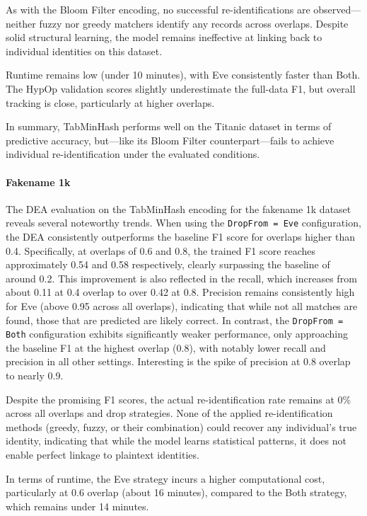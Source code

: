 As with the Bloom Filter encoding, no successful re-identifications are observed—neither fuzzy nor greedy matchers identify any records across overlaps.
Despite solid structural learning, the model remains ineffective at linking back to individual identities on this dataset.

Runtime remains low (under 10 minutes), with Eve consistently faster than Both. The HypOp validation scores slightly underestimate the full-data F1, but overall tracking is close, particularly at higher overlaps.

In summary, TabMinHash performs well on the Titanic dataset in terms of predictive accuracy, but—like its Bloom Filter counterpart—fails to achieve individual re-identification under the evaluated conditions.


\paragraph{Fakename 1k}
The DEA evaluation on the TabMinHash encoding for the fakename 1k dataset reveals several noteworthy trends.
When using the \texttt{DropFrom = Eve} configuration, the DEA consistently outperforms the baseline F1 score for overlaps higher than 0.4.
Specifically, at overlaps of 0.6 and 0.8, the trained F1 score reaches approximately 0.54 and 0.58 respectively, clearly surpassing the baseline of around 0.2.
This improvement is also reflected in the recall, which increases from about 0.11 at 0.4 overlap to over 0.42 at 0.8.
Precision remains consistently high for Eve (above 0.95 across all overlaps), indicating that while not all matches are found, those that are predicted are likely correct.
In contrast, the \texttt{DropFrom = Both} configuration exhibits significantly weaker performance, only approaching the baseline F1 at the highest overlap (0.8), with notably lower recall and precision in all other settings.
Interesting is the spike of precision at 0.8 overlap to nearly 0.9.

Despite the promising F1 scores, the actual re-identification rate remains at 0\% across all overlaps and drop strategies.
None of the applied re-identification methods (greedy, fuzzy, or their combination) could recover any individual's true identity, indicating that while the model learns statistical patterns, it does not enable perfect linkage to plaintext identities.

In terms of runtime, the Eve strategy incurs a higher computational cost, particularly at 0.6 overlap (about 16 minutes), compared to the Both strategy, which remains under 14 minutes.

